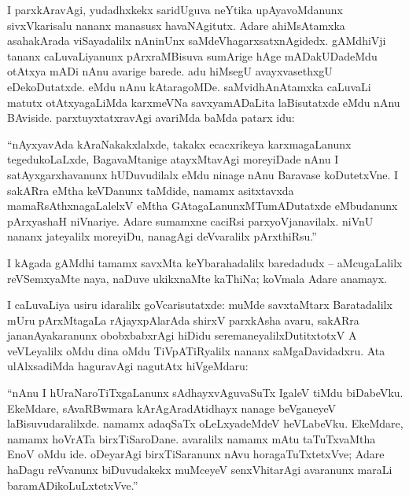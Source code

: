 I parxkAravAgi, yudadhxkekx saridUguva neYtika upAyavoMdanunx sivxVkarisalu nananx manasusx havaNAgitutx. Adare ahiMsAtamxka asahakArada viSayadalilx nAninUnx saMdeVhagarxsatxnAgidedx. gAMdhiVji tananx caLuvaLiyanunx pArxraMBisuva sumArige hAge mADakUDadeMdu otAtxya mADi nAnu avarige barede. adu hiMsegU avayxvasethxgU eDekoDutatxde. eMdu nAnu kAtaragoMDe. saMvidhAnAtamxka caLuvaLi matutx otAtxyagaLiMda karxmeVNa savxyamADaLita laBisutatxde eMdu nAnu BAviside. parxtuyxtatxravAgi avariMda baMda patarx idu:

\begin{minipage}[c]{.5cm}
\quad 
\end{minipage}
\begin{minipage}[c]{8.5cm}
``nAyxyavAda kAraNakakxlalxde, takakx ecacxrikeya karxmagaLanunx tegedukoLaLxde, BagavaMtanige atayxMtavAgi moreyiDade nAnu I satAyxgarxhavanunx hUDuvudilalx eMdu ninage nAnu Baravase koDutetxVne. I sakARra eMtha keVDanunx taMdide, namamx asitxtavxda mamaRsAthxnagaLalelxV eMtha GAtagaLanunxMTumADutatxde eMbudanunx pArxyashaH niVnariye. Adare sumamxne caciRsi parxyoVjanavilalx. niVnU nananx jateyalilx moreyiDu, nanagAgi deVvaralilx pArxthiRsu.''
\end{minipage}

I kAgada gAMdhi tamamx savxMta keYbarahadalilx baredadudx -- aMcugaLalilx reVSemxyaMte naya, naDuve ukikxnaMte kaThiNa; koVmala Adare anamayx.

I caLuvaLiya usiru idaralilx goVcarisutatxde: muMde savxtaMtarx Baratadalilx mUru pArxMtagaLa rAjayxpAlarAda shirxV parxkAsha avaru, sakARra jananAyakaranunx obobxbabxrAgi hiDidu seremaneyalilxDutitxtotxV A veVLeyalilx oMdu dina oMdu TiVpATiRyalilx nananx saMgaDavidadxru. Ata ulAlxsadiMda haguravAgi nagutAtx hiVgeMdaru:

\begin{minipage}[c]{.5cm}
\quad 
\end{minipage}
\begin{minipage}[c]{8.5cm}
``nAnu I hUraNaroTiTxgaLanunx sAdhayxvAguvaSuTx IgaleV tiMdu biDabeVku. EkeMdare, sAvaRBwmara kArAgAradAtidhayx nanage beVganeyeV laBisuvudaralilxde. namamx adaqSaTx oLeLxyadeMdeV heVLabeVku. EkeMdare, namamx hoVrATa birxTiSaroDane. avaralilx namamx mAtu taTuTxvaMtha EnoV oMdu ide. oDeyarAgi birxTiSaranunx nAvu horagaTuTxtetxVve; Adare haDagu reVvanunx biDuvudakekx muMceyeV senxVhitarAgi avaranunx maraLi baramADikoLuLxtetxVve.''
\end{minipage}

